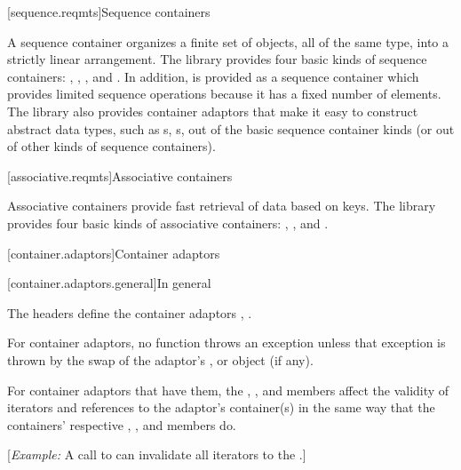 \noindent\makebox[\linewidth]{\rule{\textwidth}{0.4pt}}

[sequence.reqmts]{Sequence containers}

\pnum
A sequence container organizes a finite set of objects, all of the same type, into a strictly
linear arrangement. The library provides four basic kinds of sequence containers:
, , , and . In addition,
 is provided as a sequence container which provides limited sequence operations
because it has a fixed number of elements. The library also provides container
adaptors that make it easy to construct abstract data types, such
as s, s, out of the basic sequence container kinds (or out
of other kinds of sequence containers).

\setcounter{subsection}{6}

\noindent\makebox[\linewidth]{\rule{\textwidth}{0.4pt}}

[associative.reqmts]{Associative containers}

\pnum
Associative containers provide fast retrieval of data based on keys.
The library provides four basic kinds of associative containers:
,
,
and
.

\setcounter{chapter}{21}
\setcounter{section}{5}
[container.adaptors]{Container adaptors}

[container.adaptors.general]{In general}

\pnum
The headers   define the container adaptors ,
 .

\pnum
For container adaptors, no  function throws an exception unless
that exception is thrown by the swap of the
adaptor's , or
 object (if any).

\begin{addedblock}
\pnum
For container adaptors that have them, the , ,
and  members affect the validity of iterators and references to
the adaptor's container(s) in the same way that the containers'
respective , , and  members do.

[\textit{Example:} A call to  can invalidate all iterators to
the .]
\end{addedblock}

